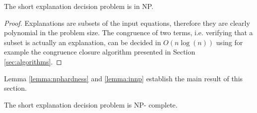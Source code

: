\begin{lemma}[In NP]
\label{lemma:innp}
The short explanation decision problem is in NP.

\end{lemma}
\begin{proof}

Explanations are subsets of the input equations, therefore they are clearly polynomial in the problem size.
The congruence of two terms, i.e. verifying that a subset is actually an explanation, can be decided in $O(n \log(n))$ using for example the congruence closure algorithm presented in Section \ref{sec:algorithms}.

\end{proof}

Lemma \ref{lemma:nphardness} and \ref{lemma:innp} establish the main result of this section.

\begin{theorem}[NP - completeness]

The short explanation decision problem is NP- complete.

\end{theorem}